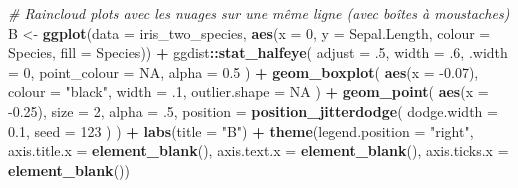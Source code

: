 \documentclass[
  french,
]{book}
\newenvironment{Shaded}{\begin{snugshade}}{\end{snugshade}}
\newcommand{\CommentTok}[1]{\textcolor[rgb]{0.56,0.35,0.01}{\textit{#1}}}
\newcommand{\DataTypeTok}[1]{\textcolor[rgb]{0.13,0.29,0.53}{#1}}
\newcommand{\DecValTok}[1]{\textcolor[rgb]{0.00,0.00,0.81}{#1}}
\newcommand{\FloatTok}[1]{\textcolor[rgb]{0.00,0.00,0.81}{#1}}
\newcommand{\KeywordTok}[1]{\textcolor[rgb]{0.13,0.29,0.53}{\textbf{#1}}}
\newcommand{\NormalTok}[1]{#1}
\newcommand{\OperatorTok}[1]{\textcolor[rgb]{0.81,0.36,0.00}{\textbf{#1}}}
\newcommand{\OtherTok}[1]{\textcolor[rgb]{0.56,0.35,0.01}{#1}}
\newcommand{\StringTok}[1]{\textcolor[rgb]{0.31,0.60,0.02}{#1}}
\begin{document}
\begin{Shaded}
\begin{Highlighting}[]
\CommentTok{# Raincloud plots avec les nuages sur une même ligne (avec boîtes à moustaches)}
\NormalTok{B <-}
\StringTok{  }\KeywordTok{ggplot}\NormalTok{(}\DataTypeTok{data =}\NormalTok{ iris_two_species, }
         \KeywordTok{aes}\NormalTok{(}\DataTypeTok{x =} \DecValTok{0}\NormalTok{, }\DataTypeTok{y =}\NormalTok{ Sepal.Length, }\DataTypeTok{colour =}\NormalTok{ Species, }\DataTypeTok{fill =}\NormalTok{ Species)) }\OperatorTok{+}
\StringTok{  }\NormalTok{ggdist}\OperatorTok{::}\KeywordTok{stat_halfeye}\NormalTok{(}
    \DataTypeTok{adjust =} \FloatTok{.5}\NormalTok{, }
    \DataTypeTok{width =} \FloatTok{.6}\NormalTok{, }
    \DataTypeTok{.width =} \DecValTok{0}\NormalTok{, }
    \DataTypeTok{point_colour =} \OtherTok{NA}\NormalTok{,}
    \DataTypeTok{alpha =} \FloatTok{0.5}
\NormalTok{    ) }\OperatorTok{+}
\StringTok{  }\KeywordTok{geom_boxplot}\NormalTok{(}
    \KeywordTok{aes}\NormalTok{(}\DataTypeTok{x =} \FloatTok{-0.07}\NormalTok{),}
    \DataTypeTok{colour =} \StringTok{"black"}\NormalTok{,}
    \DataTypeTok{width =} \FloatTok{.1}\NormalTok{, }
    \DataTypeTok{outlier.shape =} \OtherTok{NA}
\NormalTok{  ) }\OperatorTok{+}
\StringTok{  }\KeywordTok{geom_point}\NormalTok{(}
    \KeywordTok{aes}\NormalTok{(}\DataTypeTok{x =} \FloatTok{-0.25}\NormalTok{),}
    \DataTypeTok{size =} \DecValTok{2}\NormalTok{, }
    \DataTypeTok{alpha =} \FloatTok{.5}\NormalTok{,}
    \DataTypeTok{position =} \KeywordTok{position_jitterdodge}\NormalTok{(}
                          \DataTypeTok{dodge.width =} \FloatTok{0.1}\NormalTok{,}
                          \DataTypeTok{seed =} \DecValTok{123}
\NormalTok{                    )}
\NormalTok{  ) }\OperatorTok{+}
\StringTok{  }\KeywordTok{labs}\NormalTok{(}\DataTypeTok{title =} \StringTok{"B"}\NormalTok{) }\OperatorTok{+}
\StringTok{  }\KeywordTok{theme}\NormalTok{(}\DataTypeTok{legend.position =} \StringTok{"right"}\NormalTok{,}
        \DataTypeTok{axis.title.x =} \KeywordTok{element_blank}\NormalTok{(),}
        \DataTypeTok{axis.text.x =} \KeywordTok{element_blank}\NormalTok{(),}
        \DataTypeTok{axis.ticks.x =} \KeywordTok{element_blank}\NormalTok{()) }


\end{Highlighting}
\end{Shaded}
\end{document}
